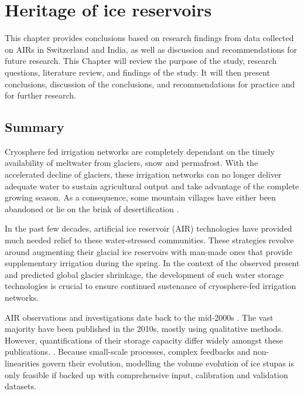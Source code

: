 \chapter{Heritage of ice reservoirs}


This chapter provides conclusions based on research findings from data collected on AIRs in Switzerland and India,
as well as discussion and recommendations for future research. This Chapter will review the purpose of the
study, research questions, literature review, and findings of the study. It will then present conclusions,
discussion of the conclusions, and recommendations for practice and for further research.

\section{Summary}

Cryosphere fed irrigation networks are completely dependant on the timely availability of meltwater from
glaciers, snow and permafrost. With the accelerated decline of glaciers, these irrigation networks can no longer
deliver adequate water to sustain agricultural output and take advantage of the complete growing season. As a
consequence, some mountain villages have either been abandoned or lie on the brink of desertification
\citep{grossmanHimalayanGlaciersMelt2015}.

In the past few decades, artificial ice reservoir (AIR) technologies have provided much needed relief to these
water-stressed communities. These strategies revolve around augmenting their glacial ice reservoirs with
man-made ones that provide supplementary irrigation during the spring. In the context of the observed present
and predicted global glacier shrinkage, the development of such water storage technologies is crucial to ensure
continued sustenance of cryosphere-fed irrigation networks.

AIR observations and investigations date back to the mid-2000s \citep{tveitenGlacierGrowingLocal2007}. The vast
majority have been published in the 2010s, mostly using qualitative methods. However, quantifications of their
storage capacity differ widely amongst these publications. \citep{baglaArtificialGlaciersHelp1998,
norphelSnowWaterHarvesting2015, nusserSociohydrologyArtificialGlaciers2019}. Because small-scale processes,
complex feedbacks and non-linearities govern their evolution, modelling the volume evolution of ice stupas is
only feasible if backed up with comprehensive input, calibration and validation datasets.

